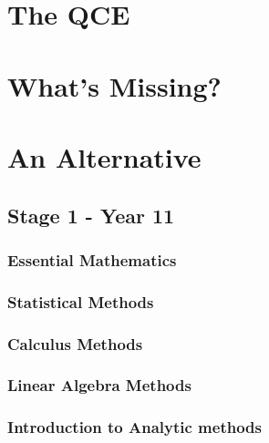 \documentclass[11pt]{report}
\begin{document}
\chapter{The QCE}





\chapter{What's Missing?}




\chapter{An Alternative}
\section{Stage 1 - Year 11}

\subsection{Essential Mathematics}

\subsection{Statistical Methods}
\subsection{Calculus Methods}
\subsection{Linear Algebra Methods}
\subsection{Introduction to Analytic methods}
\end{document}
